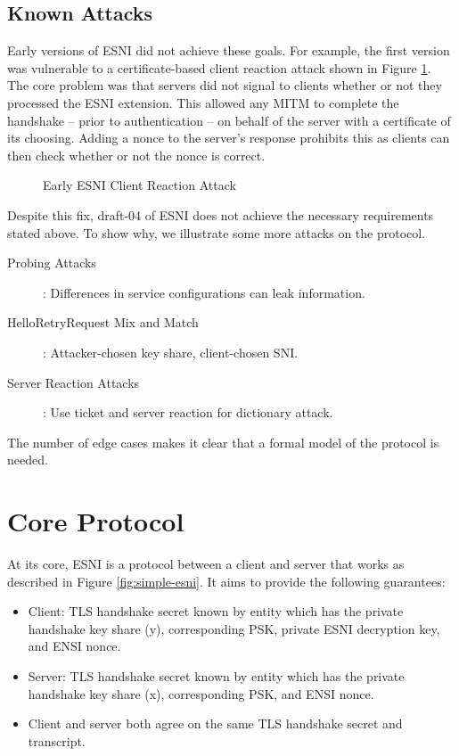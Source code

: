 \documentclass[twoside]{article}
\theoremstyle{definition}
\begin{document}
\subsection{Known Attacks} \label{sec:known-attacks}

Early versions of ESNI did not achieve these goals. For example, the first version was vulnerable to a certificate-based 
client reaction attack shown in Figure \ref{fig:attack1-client-reaction}. The core problem was that servers did not signal
to clients whether or not they processed the ESNI extension. This allowed any MITM to complete the handshake
-- prior to authentication -- on behalf of the server with a certificate of its choosing. Adding a nonce to the server's
response prohibits this as clients can then check whether or not the nonce is correct.

\begin{figure}
    \centering
    \caption{Early ESNI Client Reaction Attack}
    \label{fig:attack1-client-reaction}
\end{figure}

Despite this fix, draft-04 of ESNI does not achieve the necessary requirements stated above. To show why, we 
illustrate some more attacks on the protocol.

\begin{description}
  \item[Probing Attacks]: Differences in service configurations can leak information. %
  \item[HelloRetryRequest Mix and Match]: Attacker-chosen key share, client-chosen SNI. %
  \item[Server Reaction Attacks]: Use ticket and server reaction for dictionary attack. %
\end{description}

The number of edge cases makes it clear that a formal model of the protocol is needed.

\section{Core Protocol} %

At its core, ESNI is a protocol between a client and server that works as described in
Figure \ref{fig:simple-esni}. It aims to provide the following guarantees:
%
\begin{itemize}
  \item Client: TLS handshake secret known by entity which has the private handshake key share (y), corresponding PSK,
  private ESNI decryption key, and ENSI nonce. 
  \item Server: TLS handshake secret known by entity which has the private handshake key share (x), corresponding PSK,
  and ENSI nonce.
  \item Client and server both agree on the same TLS handshake secret and transcript.
\end{itemize}
%
\end{document}
